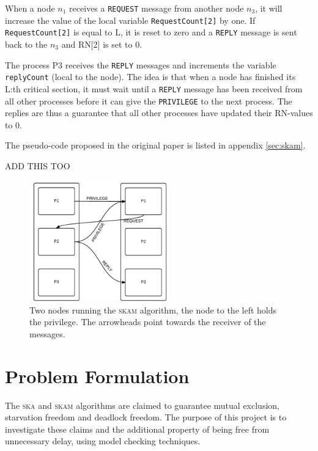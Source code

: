 \documentclass[a4paper,10pt]{llncs}
\begin{document}
When a node $n_1$ receives a \texttt{REQUEST} message from another node $n_3$, it will increase the value of the local variable \texttt{RequestCount[2]} by one. If \texttt{RequestCount[2]} is equal to L, it is reset to zero and a \texttt{REPLY} message is sent back to the $n_3$ and RN[2] is set to 0.

The process P3 receives the \texttt{REPLY} messages and increments the variable \texttt{replyCount} (local to the node). The idea is that when a node has finished its L:th critical section, it must wait until a \texttt{REPLY} message has been received from all other processes before it can give the \texttt{PRIVILEGE} to the next process. The replies are thus a guarantee that all other processes have updated their RN-values to 0.

The pseudo-code proposed in the original paper is listed in appendix \ref{sec:skam}.

ADD THIS TOO

\begin{figure}[t]
\begin{center}
\includegraphics[width=0.55\textwidth]{Skaskam.pdf}
 \caption[Close up of \textit{Hemidactylus} sp.]
   {Two nodes running the \textsc{skam} algorithm, the node to the left holds the privilege. The arrowheads point towards the receiver of the messages.}
\end{center}
\end{figure}


\section{Problem Formulation}
The \textsc{ska} and \textsc{skam} algorithms are claimed to guarantee mutual exclusion, starvation freedom and deadlock freedom. The purpose of this project is to investigate these claims and the additional property of being free from unnecessary delay, using model checking techniques. 
\end{document}
